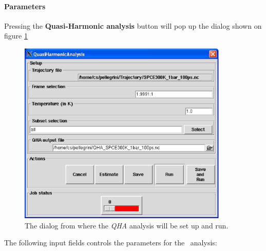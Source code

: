 \documentclass[a4paper,11pt]{report}
\begin{document}
\paragraph{Parameters\\}
\label{qha_parameters}
Pressing the \textbf{Quasi-Harmonic analysis} button will pop up the dialog shown on figure \ref{fig:qha}
\begin{figure}[h!]
\begin{center}
\includegraphics[width=10cm]{Figures/qha.eps}
\end{center}
\caption[The \textit{QHA} analysis dialog]{The dialog from where the \textit{QHA} analysis will be set up and run.}
\label{fig:qha}
\end{figure}   

The following input fields controls the parameters for the \QHA\ analysis:
\end{document}
